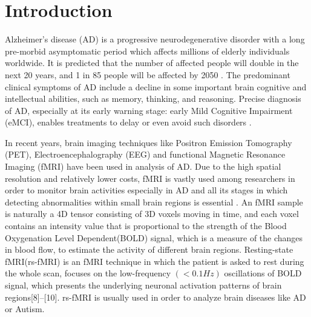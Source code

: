 \documentclass[preprint,12pt]{elsarticle}
\begin{document}
\begin{frontmatter}
\begin{keyword}


\end{keyword}

\end{frontmatter}


\section{Introduction}
\label{Intro}
Alzheimer’s disease (AD) is a progressive neurodegenerative disorder with a long pre-morbid asymptomatic period which affects millions of elderly individuals worldwide\cite{r01}. It is predicted that the number of affected people will double in the next 20 years, and 1 in 85 people will be affected by 2050 \cite{r02}. The predominant clinical symptoms of AD include a decline in some important brain cognitive and intellectual abilities, such as memory, thinking, and reasoning. Precise diagnosis of AD, especially at its early warning stage: early Mild Cognitive Impairment (eMCI), enables treatments to delay or even avoid such disorders \cite{r03}.

In recent years, brain imaging techniques like Positron Emission Tomography (PET)\cite{r21}, Electroencephalography (EEG)\cite{r22}
	 and functional Magnetic Resonance Imaging (fMRI)\cite{r23} 
	 have been used in analysis of AD. Due to the high spatial resolution and relatively lower costs, fMRI is vastly used among researchers in order to monitor brain activities especially in AD and all its stages in which detecting abnormalities within small brain regions is essential \cite{r04}. 
	An fMRI sample is naturally a 4D tensor consisting of 3D voxels moving in time, and each voxel contains an intensity value that is proportional to the strength of the Blood Oxygenation Level Dependent(BOLD) signal, which is a measure of the changes in blood flow, to estimate the activity of different brain regions\cite{r07}.
	Resting-state fMRI(rs-fMRI) is an fMRI technique in which the patient is asked to rest during the whole scan, focuses on the low-frequency $\left( < 0.1 Hz \right)$  oscillations of BOLD signal, which presents the underlying neuronal activation patterns of brain regions[8]–[10]. rs-fMRI is usually used in order to analyze brain diseases like AD or Autism\cite{r33,r34}.
	
\end{document}
